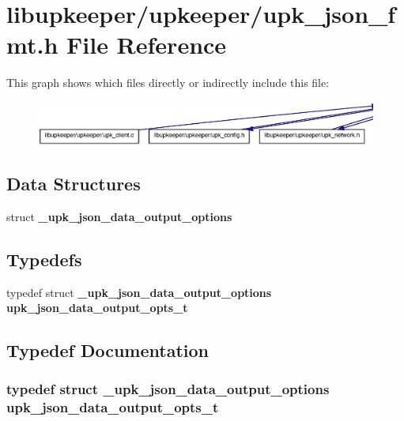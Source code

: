 \section{libupkeeper/upkeeper/upk\_\-json\_\-fmt.h File Reference}
\label{upk__json__fmt_8h}
This graph shows which files directly or indirectly include this file:\nopagebreak
\begin{figure}[H]
\begin{center}
\leavevmode
\includegraphics[width=400pt]{upk__json__fmt_8h__dep__incl}
\end{center}
\end{figure}
\subsection*{Data Structures}
\begin{DoxyCompactItemize}
\item 
struct {\bf \_\-upk\_\-json\_\-data\_\-output\_\-options}
\end{DoxyCompactItemize}
\subsection*{Typedefs}
\begin{DoxyCompactItemize}
\item 
typedef struct {\bf \_\-upk\_\-json\_\-data\_\-output\_\-options} {\bf upk\_\-json\_\-data\_\-output\_\-opts\_\-t}
\end{DoxyCompactItemize}


\subsection{Typedef Documentation}
\subsubsection[{upk\_\-json\_\-data\_\-output\_\-opts\_\-t}]{\setlength{\rightskip}{0pt plus 5cm}typedef struct {\bf \_\-upk\_\-json\_\-data\_\-output\_\-options}  {\bf upk\_\-json\_\-data\_\-output\_\-opts\_\-t}}\label{upk__json__fmt_8h_afa9f9642614352aa6be4a2a8745bfbe4}
